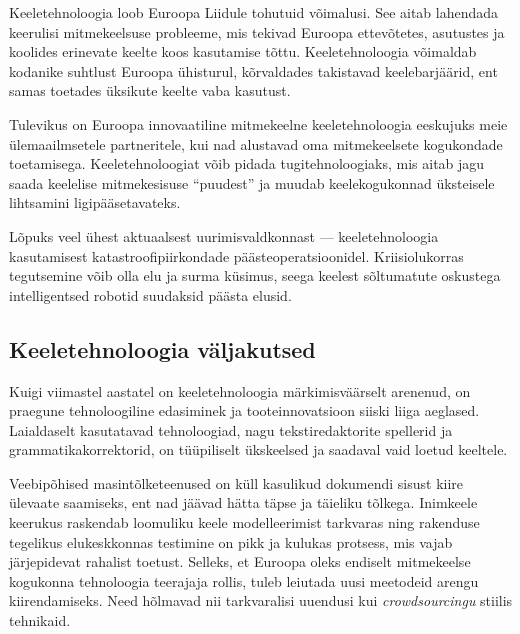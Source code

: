 \documentclass[]{../metanetpaper}
\begin{document}
\begin{multicols}{2}
Keeletehnoloogia loob Euroopa Liidule tohutuid võimalusi. 
See aitab lahendada keerulisi mitmekeelsuse probleeme, mis tekivad Euroopa ettevõtetes, asutustes ja koolides erinevate keelte koos kasutamise tõttu. 
Keeletehnoloogia võimaldab kodanike suhtlust Euroopa ühisturul, kõrvaldades takistavad keelebarjäärid, ent samas toetades üksikute keelte vaba kasutust.


Tulevikus on Euroopa innovaatiline mitmekeelne keeletehnoloogia eeskujuks meie ülemaailmsetele partneritele, kui nad alustavad oma mitmekeelsete kogukondade toetamisega. Keeletehnoloogiat võib pidada tugitehnoloogiaks, mis aitab jagu saada keelelise mitmekesisuse ``puu\-dest'' ja muudab keelekogukonnad üksteisele lihtsamini ligipääsetavateks.




Lõpuks veel ühest aktuaalsest uurimis\-vald\-konnast --- keeletehnoloogia kasutamisest katastroofipiirkondade pääste\-operatsioonidel. 
Kriisiolukorras tegutsemine võib olla elu ja surma küsimus, seega keelest sõltumatute oskustega intelligentsed robotid suudaksid päästa elusid.

\subsection{Keeletehnoloogia väljakutsed}

Kuigi viimastel aastatel on keeletehno\-loogia märkimisväärselt arenenud, on praegune tehnoloogiline edasiminek ja tooteinnovatsioon siiski liiga aeglased. 
Laial\-daselt kasutatavad tehnoloogiad, nagu tekstiredaktorite spellerid ja grammatika\-korrektorid, on tüüpiliselt ükskeelsed ja saadaval vaid loetud keeltele. 



Veebipõhised masintõlketeenused on küll kasulikud dokumendi sisust kiire ülevaate saamiseks, ent nad jäävad hätta täpse ja täieliku tõlkega. 
Inimkeele keerukus raskendab loomuliku keele modelleerimist tarkvaras ning raken\-duse tegelikus elukeskkonnas testimine on pikk ja kulukas protsess, mis vajab järjepidevat rahalist toetust. 
Sel\-leks, et Euroopa oleks endiselt mitmekeelse kogukonna tehnoloogia tee\-rajaja rollis, tuleb leiutada uusi meetodeid arengu kii\-ren\-da\-miseks. 
Need hõlmavad nii tark\-varalisi uuendusi kui \textit{crowdsourcingu} stiilis tehnikaid.


\end{multicols}
\end{document}
